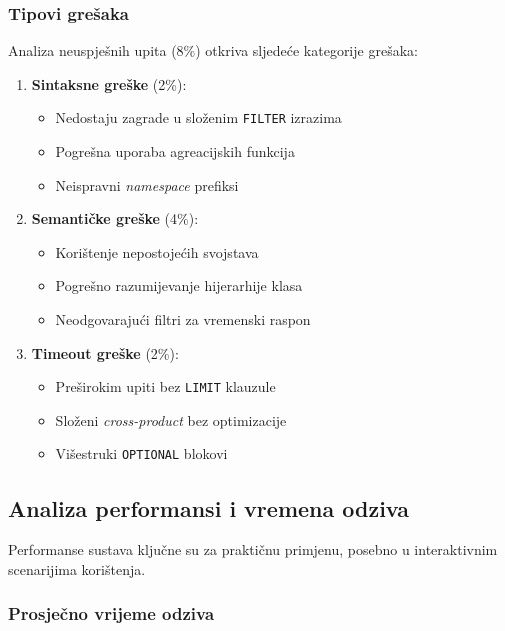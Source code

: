 \subsubsection{Tipovi grešaka}

Analiza neuspješnih upita (8\%) otkriva sljedeće kategorije grešaka:

\begin{enumerate}
    \item \textbf{Sintaksne greške} (2\%):
    \begin{itemize}
        \item Nedostaju zagrade u složenim \texttt{FILTER} izrazima
        \item Pogrešna uporaba agreacijskih funkcija
        \item Neispravni \textit{namespace} prefiksi
    \end{itemize}
    
    \item \textbf{Semantičke greške} (4\%):
    \begin{itemize}
        \item Korištenje nepostojećih svojstava
        \item Pogrešno razumijevanje hijerarhije klasa
        \item Neodgovarajući filtri za vremenski raspon
    \end{itemize}
    
    \item \textbf{Timeout greške} (2\%):
    \begin{itemize}
        \item Preširokim upiti bez \texttt{LIMIT} klauzule
        \item Složeni \textit{cross-product} bez optimizacije
        \item Višestruki \texttt{OPTIONAL} blokovi
    \end{itemize}
\end{enumerate}

\subsection{Analiza performansi i vremena odziva}

Performanse sustava ključne su za praktičnu primjenu, posebno u interaktivnim scenarijima korištenja.

\subsubsection{Prosječno vrijeme odziva}


